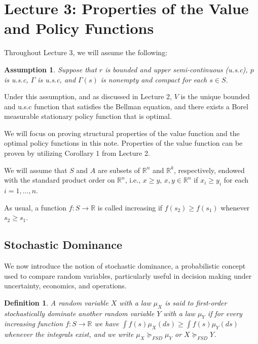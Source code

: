 \documentclass[letter,11pt]{article}
\newtheorem{assumption}{Assumption}[section]
\newtheorem{definition}{Definition}[section]
\begin{document}
\newpage 

\section{Lecture 3: Properties of the Value and Policy Functions}







Throughout Lecture 3, we will assume the following:
\begin{assumption}
Suppose that $r$ is bounded and upper semi-continuous (u.s.c), $p$ is u.s.c, $\Gamma$ is u.s.c, and $\Gamma(s)$ is nonempty and compact for each $s \in S$. 
\end{assumption}
Under this assumption, and as discussed in Lecture 2, $V$ is the unique bounded and u.s.c function that satisfies the Bellman equation, and there exists a Borel measurable stationary policy function that is optimal.

We will focus on proving structural properties of the value function and the optimal policy functions in this note. Properties of the value function can be proven by utilizing Corollary 1 from Lecture 2.

We will assume that $S$ and $A$ are subsets of $\mathbb{R}^{n}$ and $\mathbb{R}^{k}$, respectively, endowed with the standard product order on $\mathbb{R}^{n}$, i.e., $x \geq y$, $x,y \in \mathbb{R}^{n}$ if $x_{i} \geq y_{i}$ for each $i=1,\ldots,n$.

As usual, a function $f:S \rightarrow \mathbb{R}$ is called increasing if $f(s_{2}) \geq f(s_{1})$ whenever $s_{2} \geq s_{1}$.

\subsection{Stochastic Dominance}
We now introduce the notion of stochastic dominance, a probabilistic concept used to compare random variables, particularly useful in decision making under uncertainty, economics, and operations.

\begin{definition}
A random variable $X$ with a law $\mu_{X}$ is said to first-order stochastically dominate another random variable $Y$ with a law $\mu_{Y}$ if for every increasing function $f:S \rightarrow \mathbb{R}$ we have 
$\int f(s) \mu_{X} (ds) \geq \int f(s)  \mu_{Y} (ds)$
whenever the integrals exist, and we write $\mu_{X} \succeq_{FSD} \mu_{Y} $ or $X \succeq_{FSD} Y$. 
\end{definition}
\end{document}
